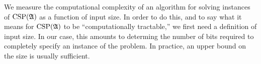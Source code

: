 We measure the computational complexity of an algorithm for solving instances
of $\operatorname{CSP}(\mathfrak A)$ as a function of input size. In order to do this, and to say
what it means for $\operatorname{CSP}(\mathfrak A)$ to be ``computationally tractable,'' we first
need a definition of input size. %
%
In our case, this amounts to determing the number of bits required to completely specify an instance of the problem. In practice, an upper bound on the size is usually sufficient. 

